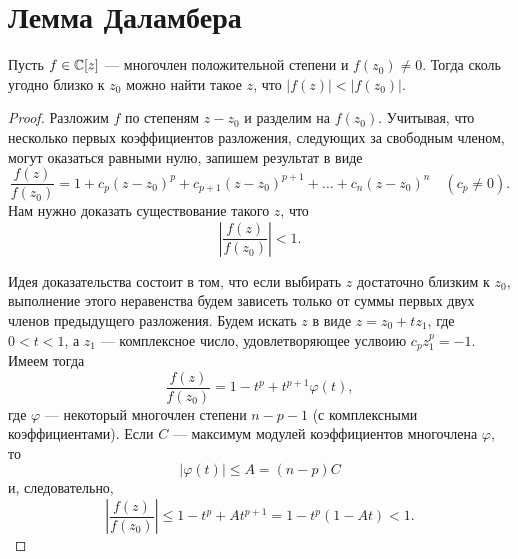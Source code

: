 \section{Лемма Даламбера}

\begin{lemma}[Даламбер]
    Пусть $f \in \mathbb{C}[z]$ --- многочлен положительной степени и $f(z_0) \ne 0$. Тогда сколь угодно близко к $z_0$ можно найти такое $z$, что $|f(z)| < |f(z_0)|$.
\end{lemma}

\begin{proof}
    Разложим $f$ по степеням $z - z_0$ и разделим на $f(z_0)$. Учитывая, что несколько первых коэффициентов разложения, следующих за свободным членом, могут оказаться равными нулю, запишем результат в виде
    $$
    \frac{f(z)}{f(z_0)} = 1 + c_p(z - z_0)^p + c_{p + 1}(z - z_0)^{p + 1} + \ldots + c_n(z - z_0)^n\quad(c_p \ne 0).
    $$
    Нам нужно доказать существование такого $z$, что
    $$
    \left|\frac{f(z)}{f(z_0)}\right| < 1.
    $$

    Идея доказательства состоит в том, что если выбирать $z$ достаточно близким к $z_0$, выполнение этого неравенства будем зависеть только от суммы первых двух членов предыдущего разложения. Будем искать $z$ в виде $z = z_0 + tz_1$, где $0 < t < 1$, а $z_1$ --- комплексное число, удовлетворяющее услвоию $c_pz_1^p = -1$. Имеем тогда
    $$
    \frac{f(z)}{f(z_0)} = 1 - t^p + t^{p + 1}\varphi(t),
    $$
    где $\varphi$ --- некоторый многочлен степени $n - p - 1$ (с комплексными коэффициентами). Если $C$ --- максимум модулей коэффициентов многочлена $\varphi$, то
    $$
    |\varphi(t)| \leqslant A = (n - p)C
    $$
    и, следовательно,
    $$
    \left|\frac{f(z)}{f(z_0)}\right| \leqslant 1 - t^p + At^{p + 1} = 1 - t^p(1 - At) < 1.
    $$
\end{proof}


